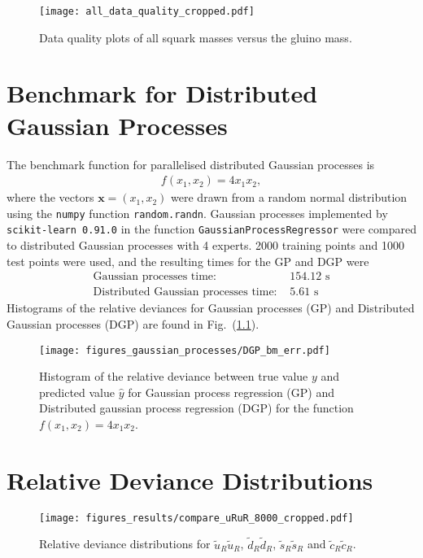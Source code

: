 \documentclass[twoside,english]{uiofysmaster}
\begin{document}
{{\begin{appendices}
\begin{figure}
\centering
\texttt{[image: all\_data\_quality\_cropped.pdf]}
\caption{Data quality plots of all squark masses versus the gluino mass.}
\end{figure}

\chapter{Benchmark for Distributed Gaussian Processes}\label{App:DGP Benchmark}

The benchmark function for parallelised distributed Gaussian processes is
\begin{align*}
f(x_1, x_2) =  4x_1x_2,
\end{align*}
where the vectors $\textbf{x} = (x_1, x_2)$ were drawn from a random normal distribution using the \verb|numpy| function \verb|random.randn|. Gaussian processes implemented by \verb|scikit-learn 0.91.0| in the function \verb|GaussianProcessRegressor| were compared to distributed Gaussian processes with 4 experts. 2000 training points and 1000 test points were used, and the resulting times for the GP and DGP were
\begin{align}
\text{Gaussian processes time: }& 154.12 \text{ s}\\
\text{Distributed Gaussian processes time: }& 5.61 \text{ s}
\end{align}
Histograms of the relative deviances for Gaussian processes (GP) and Distributed Gaussian processes (DGP) are found in Fig.\ (\ref{Fig:: gaussian process : DGP BM error histogram}).

\begin{figure}
\centering
\texttt{[image: figures\_gaussian\_processes/DGP\_bm\_err.pdf]}
\caption{Histogram of the relative deviance between true value $y$ and predicted value $\hat{y}$ for Gaussian process regression (GP) and Distributed gaussian process regression (DGP) for the function $f(x_1,x_2) = 4x_1 x_2$.}
\label{Fig:: gaussian process : DGP BM error histogram}
\end{figure}

\chapter{Relative Deviance Distributions}\label{App:: Relative Deviance Distributions}


\begin{figure}
\centering
\texttt{[image: figures\_results/compare\_uRuR\_8000\_cropped.pdf]}
\caption{Relative deviance distributions for $\widetilde{u}_R \widetilde{u}_R$, $\widetilde{d}_R \widetilde{d}_R$, $\widetilde{s}_R \widetilde{s}_R$ and $\widetilde{c}_R \widetilde{c}_R$.}
\end{figure}


\end{appendices}}}
\end{document}
